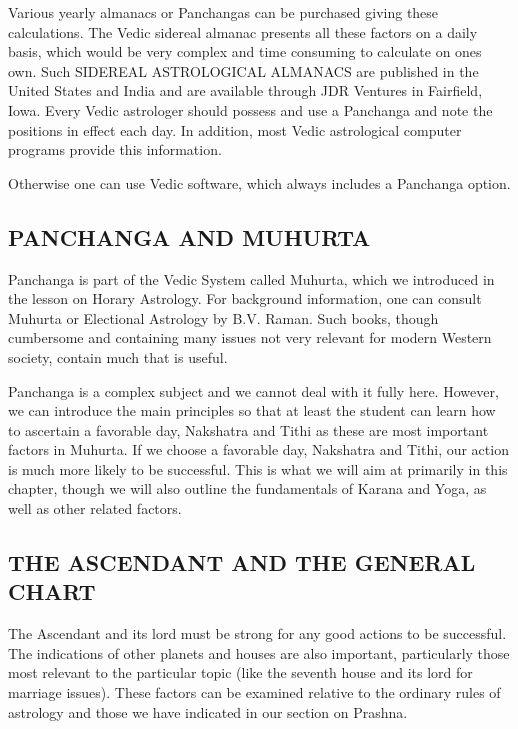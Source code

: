  

Various yearly almanacs or Panchangas can be purchased giving these calculations. The Vedic sidereal almanac presents all these factors on a daily basis, which would be very complex and time consuming to calculate on ones own. Such SIDEREAL ASTROLOGICAL ALMANACS are published in the United States and India and are available through JDR Ventures in Fairfield, Iowa. Every Vedic astrologer should possess and use a Panchanga and note the positions in effect each day. In addition, most Vedic astrological computer programs provide this information.

 

Otherwise one can use Vedic software, which always includes a Panchanga option.

 

\subsection{PANCHANGA AND MUHURTA}

 

Panchanga is part of the Vedic System called Muhurta, which we introduced in the lesson on Horary Astrology. For background information, one can consult Muhurta or Electional Astrology by B.V. Raman. Such books, though cumbersome and containing many issues not very relevant for modern Western society, contain much that is useful.

 

Panchanga is a complex subject and we cannot deal with it fully here. However, we can introduce the main principles so that at least the student can learn how to ascertain a favorable day, Nakshatra and Tithi as these are most important factors in Muhurta. If we choose a favorable day, Nakshatra and Tithi, our action is much more likely to be successful. This is what we will aim at primarily in this chapter, though we will also outline the fundamentals of Karana and Yoga, as well as other related factors.

 

\subsection{THE ASCENDANT AND THE GENERAL CHART}

 

The Ascendant and its lord must be strong for any good actions to be successful. The indications of other planets and houses are also important, particularly those most relevant to the particular topic (like the seventh house and its lord for marriage issues). These factors can be examined relative to the ordinary rules of astrology and those we have indicated in our section on Prashna.


